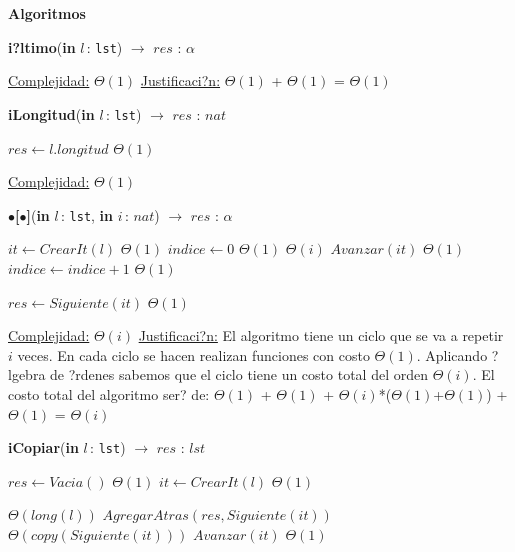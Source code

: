 \documentclass[a4paper,10pt]{article}
\let\TipoVariable=\texttt
\let\ModificadorArgumento=\textbf
\newcommand{\In}[2]{\ModificadorArgumento{in} \ensuremath{#1}\,: \TipoVariable{#2}\xspace}
\newenvironment{Algoritmos}{%
  \vspace*{2ex}%
  \noindent\textbf{\Large Algoritmos}%
  \vspace*{2ex}%
}{}
\begin{document}
\begin{Algoritmos}
\begin{algorithm}[H]{\textbf{i?ltimo}(\In{l}{lst}) $\to$ $res$ : $\alpha$}
\begin{algorithmic}[1]
			\medskip
			\Statex \underline{Complejidad:} $\Theta(1)$
			\Statex \underline{Justificaci?n:} $\Theta(1)$ + $\Theta(1)$ = $\Theta(1)$
    	\end{algorithmic}
\end{algorithm}	
	
\begin{algorithm}[H]{\textbf{iLongitud}(\In{l}{lst}) $\to$ $res$ : $nat$}	
	\begin{algorithmic}[1]
			 \State $res \gets l.longitud$	\Comment $\Theta(1)$ 
    	
		\medskip
		\Statex \underline{Complejidad:}  $\Theta(1)$
    \end{algorithmic}
\end{algorithm}	
	
\begin{algorithm}[H]{\textbf{$\bullet$[$\bullet$]}(\In{l}{lst}, \In{i}{$nat$}) $\to$ $res$ : $\alpha$}	
	\begin{algorithmic}[1]
			 \State $it \gets CrearIt(l)$		\Comment $\Theta(1)$
			 \State $indice \gets 0$		\Comment $\Theta(1)$
			 			\Comment $\Theta(i)$
			 	\State $Avanzar(it)$		\Comment $\Theta(1)$
				\State $indice \gets indice + 1$		\Comment $\Theta(1)$
			 \EndWhile
			 
			 \State $res \gets Siguiente(it)$		\Comment $\Theta(1)$
    	
		\medskip
		\Statex \underline{Complejidad:} $\Theta(i)$
		\Statex \underline{Justificaci?n:} El algoritmo tiene un ciclo que se va a repetir $i$ veces. En cada ciclo se hacen realizan funciones con costo $\Theta(1)$. Aplicando ?lgebra de ?rdenes sabemos que el ciclo tiene un costo total del orden $\Theta(i)$. El costo total del algoritmo ser? de:  $\Theta(1)$ + $\Theta(1)$ + $\Theta(i)$*($\Theta(1)$+$\Theta(1)$) + $\Theta(1)$ = $\Theta(i)$
    \end{algorithmic}
\end{algorithm}	


\begin{algorithm}[H]{\textbf{iCopiar}(\In{l}{lst}) $\to$ $res$ : $lst$}	
	\begin{algorithmic}[1]
			\State $res \gets Vacia()$	\Comment $\Theta(1)$
			\State $it \gets CrearIt(l)$	\Comment $\Theta(1)$
			
			 	\Comment $\Theta(long(l))$
			 	\State $AgregarAtras(res, Siguiente(it))$	\Comment $\Theta(copy(Siguiente(it)))$
				\State $Avanzar(it)$	\Comment $\Theta(1)$
			\EndWhile
    	

\end{algorithmic}
\end{algorithm}
\end{Algoritmos}
\end{document}
